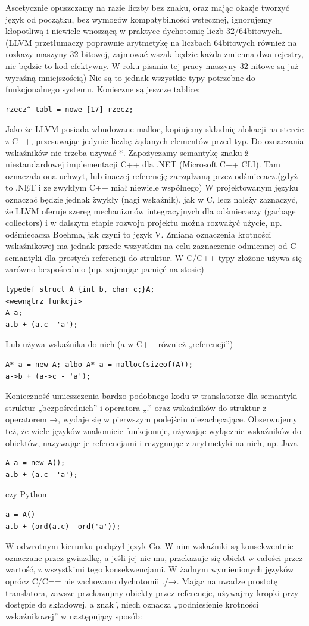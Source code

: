 Ascetycznie opuszczamy na razie liczby bez znaku, oraz mając okazje tworzyć język od początku, bez wymogów kompatybilności wstecznej, ignorujemy kłopotliwą i niewiele wnoszącą w praktyce dychotomię liczb 32/64bitowych. (LLVM przetłumaczy poprawnie arytmetykę na liczbach 64bitowych również na rozkazy maszyny 32 bitowej, zajmować wszak będzie każda zmienna dwa rejestry, nie będzie to kod efektywny. W roku pisania tej pracy maszyny 32 nitowe są już wyraźną mniejszością)
Nie są to jednak wszystkie typy potrzebne do funkcjonalnego systemu. Konieczne są jeszcze tablice:
\begin{lstlisting}
rzecz^ tabl = nowe [17] rzecz;
\end{lstlisting}
Jako że LLVM posiada wbudowane malloc, kopiujemy składnię alokacji na stercie z C++, przesuwając jedynie liczbę żądanych elementów przed typ.
Do oznaczania wskaźników nie trzeba używać *. Zapożyczamy semantykę znaku \^ z niestandardowej implementacji C++ dla .NET (Microsoft C++ CLI). Tam oznaczała ona uchwyt, lub inaczej referencję zarządzaną przez odśmiecacz.(gdyż to .NĘT i ze zwykłym C++ miał niewiele wspólnego) W projektowanym języku oznaczać będzie jednak \^ zwykły (nagi wskaźnik), jak w C, lecz należy zaznaczyć, że LLVM oferuje szereg mechanizmów integracyjnych dla odśmiecaczy (garbage collectors) i w dalszym etapie rozwoju projektu można rozważyć użycie, np. odśmiecacza Boehma, jak czyni to język V.\cite{vlang_repo}
Zmiana oznaczenia krotności wskaźnikowej ma jednak przede wszystkim na celu zaznaczenie odmiennej od C semantyki dla prostych referencji do struktur. W C/C++ typy złożone używa się zarówno bezpośrednio (np. zajmując pamięć na stosie)
\begin{lstlisting}
typedef struct A {int b, char c;}A;
<wewnątrz funkcji>
A a;
a.b + (a.c- 'a');
\end{lstlisting}
Lub używa wskaźnika do nich (a w C++ również „referencji”)
\begin{lstlisting}
A* a = new A; albo A* a = malloc(sizeof(A));
a->b + (a->c - 'a');
\end{lstlisting}
Konieczność umieszczenia bardzo podobnego kodu w translatorze dla semantyki struktur „bezpośrednich” i operatora „.” oraz wskaźników do struktur z operatorem →, wydaje się w pierwszym podejściu niezachęcające. Obserwujemy też, że wiele języków znakomicie funkcjonuje, używając wyłącznie wskaźników do obiektów, nazywając je referencjami i rezygnując z arytmetyki na nich, np. Java
\begin{lstlisting}
A a = new A(); 
a.b + (a.c- 'a');
\end{lstlisting}
czy Python
\begin{lstlisting}
a = A() 
a.b + (ord(a.c)- ord('a'));
\end{lstlisting}
W odwrotnym kierunku podążył język Go. W nim wskaźniki są konsekwentnie oznaczane przez gwiazdkę, a jeśli jej nie ma, przekazuje się obiekt w całości przez wartość, z wszystkimi tego konsekwencjami.
W żadnym wymienionych języków oprócz C/C== nie zachowano dychotomii ./→.
Mając na uwadze prostotę translatora, zawsze przekazujmy obiekty przez referencje, używajmy kropki przy dostępie do składowej, a znak \^, niech oznacza „podniesienie krotności wskaźnikowej” w następujący sposób:

